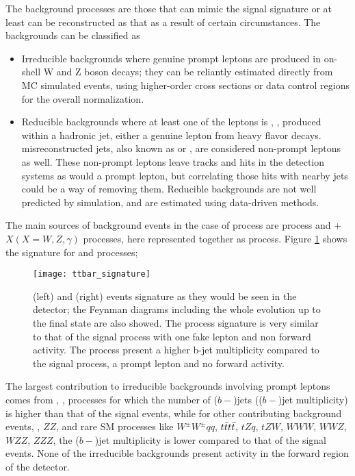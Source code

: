 The background processes are those that can mimic the signal signature or at least can be reconstructed as that as a result of certain circumstances. The backgrounds can be classified as

\begin{itemize}

\item Irreducible backgrounds where genuine prompt leptons are produced in on-shell W and Z boson decays; they can be reliantly estimated directly from MC simulated events, using higher-order cross sections or data control regions for the overall normalization.

\item Reducible backgrounds where at least one of the leptons is , \ie, produced within a hadronic jet, either a genuine lepton from heavy flavor decays. misreconstructed jets, also known as  or , are considered non-prompt leptons as well. These non-prompt leptons leave tracks and hits in the detection systems as would a prompt lepton, but correlating those hits with nearby jets could be a way of removing them. Reducible backgrounds are not well predicted by simulation, and are estimated using data-driven methods.
\end{itemize}

The main sources of background events in the case of \tHq process are \ttbar process and \ttbar + $X (X=W,Z,\gamma)$ processes, here represented together as \ttV process. Figure \ref{fig:ttbar_sign} shows the signature for \ttbar and \ttW processes;     

\begin{figure}[!htb]
\centering
\texttt{[image: ttbar\_signature]}
\caption[\ttbar and \ttW events signature]{\ttbar(left) and \ttW(right) events signature as they would be seen in the detector; the Feynman diagrams including the whole evolution up to the final state are also showed. The \ttbar process signature is very similar to that of the signal process with one fake lepton and non forward activity. The \ttW process present a higher b-jet multiplicity compared to the signal process, a prompt lepton and no forward activity.}
\label{fig:ttbar_sign}
\end{figure}

The largest contribution to irreducible backgrounds involving prompt leptons comes from \ttW, \ttZ, processes for which the number of ($b-$)jets (($b-$)jet multiplicity) is higher than that of the signal events, while for other contributing background events, \WZ, $ZZ$, and rare SM processes like $W^\pm W^\pm qq$, $t\bar{t}t\bar{t}$, $tZq$, $tZW$, $WWW$, $WWZ$, $WZZ$, $ZZZ$, the ($b-$)jet multiplicity is lower compared to that of the signal events. None of the irreducible backgrounds present activity in the forward region of the detector.

